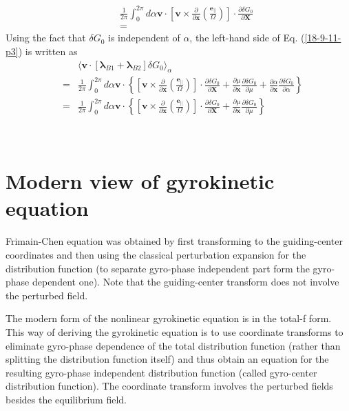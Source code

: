 \documentclass{llncs}
\newcommand{\tmmathbf}[1]{\ensuremath{\boldsymbol{#1}}}
\begin{document}
\begin{eqnarray*}
  &  & \frac{1}{2 \pi} \int_0^{2 \pi} d \alpha \mathbf{v} \cdot \left[
  \mathbf{v} \times \frac{\partial}{\partial \mathbf{x}} \left(
  \frac{\tmmathbf{e}_{\parallel}}{\Omega} \right) \right] \cdot \frac{\partial
  \delta G_0}{\partial \mathbf{X}}\\
  &  & =
\end{eqnarray*}
Using the fact that $\delta G_0$ is independent of $\alpha$, the left-hand
side of Eq. (\ref{18-9-11-p3}) is written as
\begin{eqnarray*}
  &  & \langle \mathbf{v} \cdot [\tmmathbf{\lambda}_{B 1}
  +\tmmathbf{\lambda}_{B 2}] \delta G_0 \rangle_{\alpha}\\
  & = & \frac{1}{2 \pi} \int_0^{2 \pi} d \alpha \mathbf{v} \cdot \left\{
  \left[ \mathbf{v} \times \frac{\partial}{\partial \mathbf{x}} \left(
  \frac{\tmmathbf{e}_{\parallel}}{\Omega} \right) \right] \cdot \frac{\partial
  \delta G_0}{\partial \mathbf{X}} + \frac{\partial \mu}{\partial \mathbf{x}} 
  \frac{\partial \delta G_0}{\partial \mu} + \frac{\partial \alpha}{\partial
  \mathbf{x}}  \frac{\partial \delta G_0}{\partial \alpha} \right\}\\
  & = & \frac{1}{2 \pi} \int_0^{2 \pi} d \alpha \mathbf{v} \cdot \left\{
  \left[ \mathbf{v} \times \frac{\partial}{\partial \mathbf{x}} \left(
  \frac{\tmmathbf{e}_{\parallel}}{\Omega} \right) \right] \cdot \frac{\partial
  \delta G_0}{\partial \mathbf{X}} + \frac{\partial \mu}{\partial \mathbf{x}} 
  \frac{\partial \delta G_0}{\partial \mu} \right\}
\end{eqnarray*}


\

\section{Modern view of gyrokinetic equation}

Frimain-Chen equation was obtained by first transforming to the guiding-center
coordinates and then using the classical perturbation expansion for the
distribution function (to separate gyro-phase independent part form the
gyro-phase dependent one). Note that the guiding-center transform does not
involve the perturbed field.

The modern form of the nonlinear gyrokinetic equation is in the total-f form.
This way of deriving the gyrokinetic equation is to use coordinate transforms
to eliminate gyro-phase dependence of the total distribution function (rather
than splitting the distribution function itself) and thus obtain an equation
for the resulting gyro-phase independent distribution function (called
gyro-center distribution function). The coordinate transform involves the
perturbed fields besides the equilibrium field.
\end{document}
